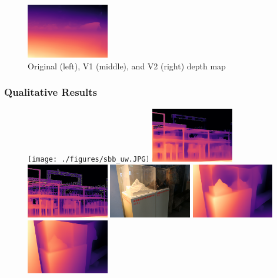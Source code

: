 \documentclass[12pt]{beamer}
\begin{document}
\begin{frame}
\begin{figure}
        \includegraphics[width=0.32\textwidth]{./figures/gl_seeli_v2-small.png}
        \caption{Original (left), V1 (middle), and V2 (right) depth map}
        \label{fig:res_1}
    \end{figure}
\end{frame}

\begin{frame}
    \frametitle{Qualitative Results}
    
    \begin{figure}
        \centering
        \texttt{[image: ./figures/sbb\_uw.JPG]}
        \includegraphics[width=0.32\textwidth]{./figures/sbb_uw_v1-small.png}
        \includegraphics[width=0.32\textwidth]{./figures/sbb_uw_v2-small.png}
        \includegraphics[width=0.32\textwidth]{./figures/schoggimatterhorn.JPG}
        \includegraphics[width=0.32\textwidth]{./figures/schoggimatterhorn_v1-small.png}
        \includegraphics[width=0.32\textwidth]{./figures/schoggimatterhorn_v2-small.png}

\end{figure}
\end{frame}
\end{document}

